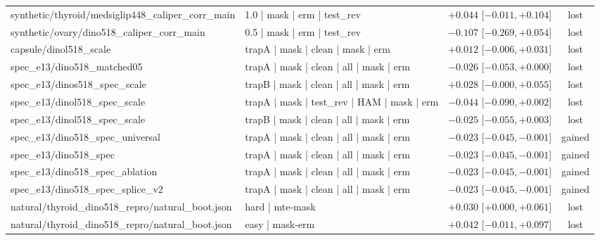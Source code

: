 \begin{table}[H]
\begin{tabular}{p{4.6cm}p{5.2cm}p{3.4cm}c}
synthetic/\allowbreak{}thyroid/\allowbreak{}medsiglip448\_\allowbreak{}caliper\_\allowbreak{}corr\_\allowbreak{}main & 1.0 | mask | erm | test\_\allowbreak{}rev & $+0.044$ [$-0.011, +0.104$] & lost \\
synthetic/\allowbreak{}ovary/\allowbreak{}dino518\_\allowbreak{}caliper\_\allowbreak{}corr\_\allowbreak{}main & 0.5 | mask | erm | test\_\allowbreak{}rev & $-0.107$ [$-0.269, +0.054$] & lost \\
capsule/\allowbreak{}dinol518\_\allowbreak{}scale & trapA | mask | clean | mask | erm & $+0.012$ [$-0.006, +0.031$] & lost \\
spec\_\allowbreak{}e13/\allowbreak{}dino518\_\allowbreak{}matched05 & trapA | mask | clean | all | mask | erm & $-0.026$ [$-0.053, +0.000$] & lost \\
spec\_\allowbreak{}e13/\allowbreak{}dinos518\_\allowbreak{}spec\_\allowbreak{}scale & trapB | mask | clean | all | mask | erm & $+0.028$ [$-0.000, +0.055$] & lost \\
spec\_\allowbreak{}e13/\allowbreak{}dinol518\_\allowbreak{}spec\_\allowbreak{}scale & trapA | mask | test\_\allowbreak{}rev | HAM | mask | erm & $-0.044$ [$-0.090, +0.002$] & lost \\
spec\_\allowbreak{}e13/\allowbreak{}dinol518\_\allowbreak{}spec\_\allowbreak{}scale & trapB | mask | clean | all | mask | erm & $-0.025$ [$-0.055, +0.003$] & lost \\
spec\_\allowbreak{}e13/\allowbreak{}dino518\_\allowbreak{}spec\_\allowbreak{}universal & trapA | mask | clean | all | mask | erm & $-0.023$ [$-0.045, -0.001$] & gained \\
spec\_\allowbreak{}e13/\allowbreak{}dino518\_\allowbreak{}spec & trapA | mask | clean | all | mask | erm & $-0.023$ [$-0.045, -0.001$] & gained \\
spec\_\allowbreak{}e13/\allowbreak{}dino518\_\allowbreak{}spec\_\allowbreak{}ablation & trapA | mask | clean | all | mask | erm & $-0.023$ [$-0.045, -0.001$] & gained \\
spec\_\allowbreak{}e13/\allowbreak{}dino518\_\allowbreak{}spec\_\allowbreak{}splice\_\allowbreak{}v2 & trapA | mask | clean | all | mask | erm & $-0.023$ [$-0.045, -0.001$] & gained \\
natural/\allowbreak{}thyroid\_\allowbreak{}dino518\_\allowbreak{}repro/\allowbreak{}natural\_\allowbreak{}boot.json & hard  |  mte-mask & $+0.030$ [$+0.000, +0.061$] & lost \\
natural/\allowbreak{}thyroid\_\allowbreak{}dino518\_\allowbreak{}repro/\allowbreak{}natural\_\allowbreak{}boot.json & easy  |  mask-erm & $+0.042$ [$-0.011, +0.097$] & lost \\

\end{tabular}
\end{table}
